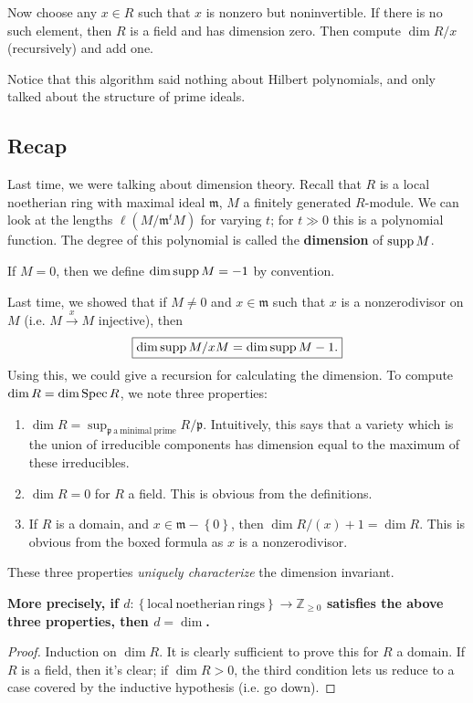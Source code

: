 Now choose any $x
\in R$ such that $x$ is nonzero but noninvertible. If there is no such element,
then $R$ is a field and has dimension zero. Then compute $\dim R/x$
(recursively) and add one.

Notice that this algorithm said nothing about Hilbert polynomials, and only
talked about the structure of prime ideals.

\subsection{Recap}
Last time, we were talking about dimension theory. 
Recall that $R$ is a local noetherian ring with maximal ideal $\mathfrak{m}$,
$M$ a finitely generated $R$-module. We can look at the lengths $\ell(M/\mathfrak{m}^t M)$
for varying $t$; for $t \gg 0$ this is a polynomial function. The degree of
this polynomial is called the \textbf{dimension} of $\operatorname{supp} M$. 

\begin{remark} 
If $M = 0$, then we define $\dim \operatorname{supp} M = -1$ by convention.
\end{remark} 

Last time, we showed that if $M \neq 0$ and $x \in \mathfrak{m}$ such that $x$
is a nonzerodivisor on $M$ (i.e. $M \stackrel{x}{\to} M$ injective), then 
\[ \boxed{ \dim \operatorname{supp} M/xM = \dim \operatorname{supp} M - 1.}\]
Using this, we could give a recursion for calculating the dimension. 
To compute $\dim R = \dim \operatorname{Spec} R$, we note three properties:
\begin{enumerate}
\item $\dim R = \sup_{\mathfrak{p} \ \mathrm{a \ minimal \ prime}}
R/\mathfrak{p}$. Intuitively, this says that a variety which is the union of
irreducible components has dimension equal to the maximum of these irreducibles.
\item $\dim R = 0$ for $R$  a field. This is obvious from the definitions.
\item If $R$ is a domain, and $x \in \mathfrak{m} - \left\{0\right\}$, then
$\dim R/(x) +1 = \dim R $. This is obvious from the boxed formula as $x$ is a nonzerodivisor.
\end{enumerate}

These three properties \emph{uniquely characterize} the dimension invariant. 

\textbf{More precisely, if
$d: \left\{\mathrm{local \ noetherian \ rings}\right\} \to \mathbb{Z}_{\geq 0}$
satisfies the above three properties, then $d = \dim $. }
\begin{proof} 
Induction on $\dim R$. It is clearly sufficient to prove this for $R$ a domain. 
If $R$ is a field, then it's clear; if $\dim R>0$, the third condition lets us
reduce to a case covered by the inductive hypothesis (i.e. go down).
\end{proof} 

